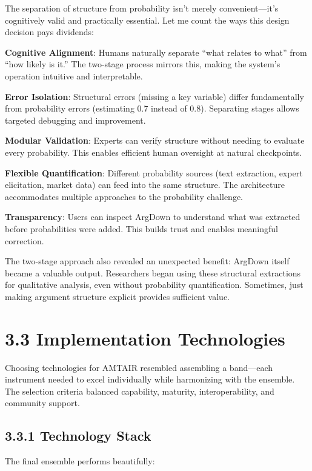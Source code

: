 \documentclass[
  11pt,
  letterpaper,
]{book}
\begin{document}
The separation of structure from probability isn't merely
convenient---it's cognitively valid and practically essential. Let me
count the ways this design decision pays dividends:

\textbf{Cognitive Alignment}: Humans naturally separate ``what relates
to what'' from ``how likely is it.'' The two-stage process mirrors this,
making the system's operation intuitive and interpretable.

\textbf{Error Isolation}: Structural errors (missing a key variable)
differ fundamentally from probability errors (estimating 0.7 instead of
0.8). Separating stages allows targeted debugging and improvement.

\textbf{Modular Validation}: Experts can verify structure without
needing to evaluate every probability. This enables efficient human
oversight at natural checkpoints.

\textbf{Flexible Quantification}: Different probability sources (text
extraction, expert elicitation, market data) can feed into the same
structure. The architecture accommodates multiple approaches to the
probability challenge.

\textbf{Transparency}: Users can inspect ArgDown to understand what was
extracted before probabilities were added. This builds trust and enables
meaningful correction.

The two-stage approach also revealed an unexpected benefit: ArgDown
itself became a valuable output. Researchers began using these
structural extractions for qualitative analysis, even without
probability quantification. Sometimes, just making argument structure
explicit provides sufficient value.

\section{3.3 Implementation Technologies}\label{sec-implementation-tech}

Choosing technologies for AMTAIR resembled assembling a band---each
instrument needed to excel individually while harmonizing with the
ensemble. The selection criteria balanced capability, maturity,
interoperability, and community support.

\subsection{3.3.1 Technology Stack}\label{sec-tech-stack}

The final ensemble performs beautifully:
\end{document}
